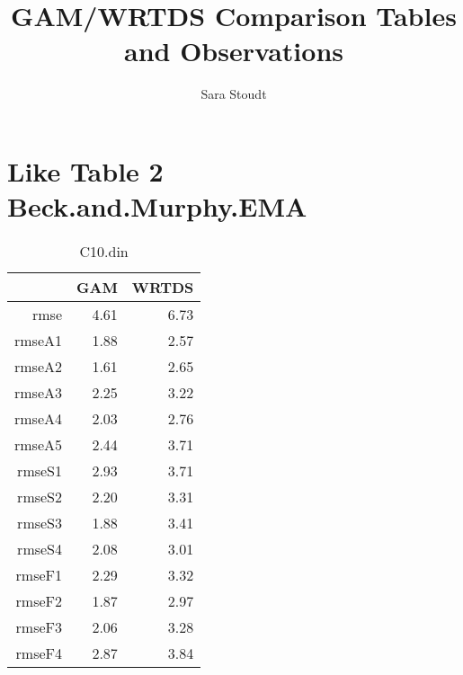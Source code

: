 \documentclass[12pt]{amsart}
\title{GAM/WRTDS Comparison Tables and Observations}
\author{Sara Stoudt}
\begin{document}
\maketitle

\section{Like Table 2 Beck.and.Murphy.EMA}
\vspace{.1in}

\begin{table}[H]
\centering
\begin{tabular}{rrr}
  \hline
 & GAM & WRTDS \\ 
  \hline
rmse & 4.61 & 6.73 \\ 
  rmseA1 & 1.88 & 2.57 \\ 
  rmseA2 & 1.61 & 2.65 \\ 
  rmseA3 & 2.25 & 3.22 \\ 
  rmseA4 & 2.03 & 2.76 \\ 
  rmseA5 & 2.44 & 3.71 \\ 
  rmseS1 & 2.93 & 3.71 \\ 
  rmseS2 & 2.20 & 3.31 \\ 
  rmseS3 & 1.88 & 3.41 \\ 
  rmseS4 & 2.08 & 3.01 \\ 
  rmseF1 & 2.29 & 3.32 \\ 
  rmseF2 & 1.87 & 2.97 \\ 
  rmseF3 & 2.06 & 3.28 \\ 
  rmseF4 & 2.87 & 3.84 \\ 
   \hline
\end{tabular}
\caption{C10.din}
\end{table}
\end{document}
